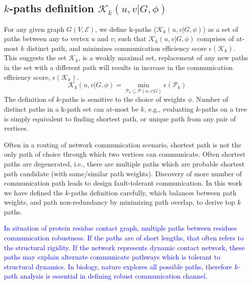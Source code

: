 \documentclass{article}
\begin{document}
\subsection{$k$-paths definition $\mathcal{K}_k(u,v\vert G,\phi)$}\label{sec:kpaths}
For any given graph $G(V,\mathcal{E})$, we define k-paths ($\mathcal{K}_{k}(u,v \vert G, \phi)$) as a set of paths between any to vertex $u$ and $v$; such that $\mathcal{K}_k(u,v\vert G,\phi)$ comprises of at-most $k$ distinct path, and minimizes communication efficiency score $\epsilon(\mathcal{K}_k)$. This suggests the set $\mathcal{K}_k$, is a weakly maximal set, replacement of any new paths in the set with a different path will results in increase in the communication efficiency  score, $\epsilon(\mathcal{K}_k)$.
\begin{equation*}
    \mathcal{K}_k(u,v\vert G,\phi) = \min_{\mathcal{P}_k \subseteq \mathcal{P}(u,v\vert G)} \epsilon(\mathcal{P}_k)
\end{equation*}
The definition of $k$-paths is sensitive to the choice of weights $\phi$. Number of distinct paths in a k-path set can at-most be $k$, e.g., evaluating $k$-paths on a tree is simply equivalent to finding shortest path, or unique path from any pair of vertices.
\par
Often in a routing of network communication scenario, shortest path is not the only path of choice through which two vertices can communicate. Often shortest paths are degenerated, i.e., there are multiple paths which are probable shortest path candidate (with same/similar path weights). Discovery of more number of communication path leads to design fault-tolerant communication. In this work we have defined the $k$-paths definition carefully, which balances between path weights, and path non-redundancy by minimizing path overlap, to derive top $k$ paths. 
\par
\begin{footnotesize}
\textcolor{blue}{In situation of protein residue contact graph, multiple paths between residues communication robustness. If the paths are of short lengths, that often refers to the structural rigidity. If the network represents dynamic contact network, these paths may explain alternate communicate pathways which is tolerant to structural dynamics. In biology, nature explores all possible paths, therefore $k$-path analysis is essential in defining robust communication channel.}
\end{footnotesize}
\end{document}
